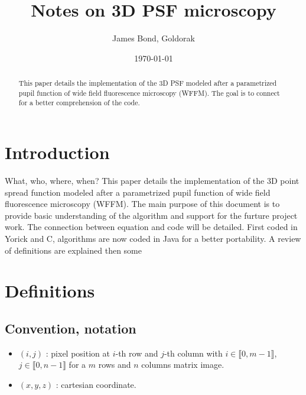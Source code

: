 \documentclass[a4paper]{article}
\title{Notes on 3D PSF microscopy}
\author{James Bond, Goldorak}
\date{\today}
\begin{document}
\maketitle
\begin{abstract}
This paper details the implementation of the 3D PSF modeled after a parametrized pupil function of wide field fluorescence microscopy (WFFM). The goal is to connect 
for a better comprehension of the code.
\end{abstract}
\tableofcontents

\section{Introduction}

What, who, where, when?
This paper details the implementation of the 3D point spread function modeled after a parametrized pupil function of wide field fluorescence microscopy (WFFM)\cite{3DBlind}.
The main purpose of this document is to provide basic understanding of the algorithm and support for the furture project work. The connection between equation and code will be detailed.
First coded in Yorick and C, algorithms are now coded in Java for a better portability.
A review of definitions are explained then some

\section{Definitions}

\subsection{Convention, notation}
\begin{itemize}
\item $(i,j)$ : pixel position at $i$-th row and $j$-th column with $i \in \llbracket 0, m-1\rrbracket$, $j \in \llbracket 0, n-1\rrbracket$ for a $m$ rows and $n$ columns matrix image.
\item $(x,y,z)$ : cartesian coordinate.
\end{itemize}
\end{document}
